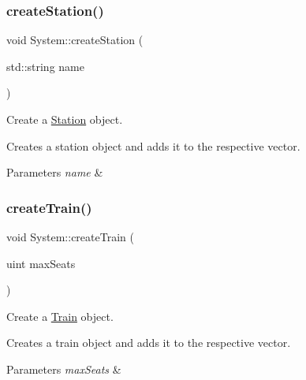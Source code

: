 \subsubsection{\texorpdfstring{create\+Station()}{createStation()}}
{\footnotesize\ttfamily void System\+::create\+Station (\begin{DoxyParamCaption}\item[{std\+::string}]{name }\end{DoxyParamCaption})}



Create a \mbox{\hyperlink{classStation}{Station}} object. 

Creates a station object and adds it to the respective vector.


\begin{DoxyParams}{Parameters}
{\em name} & \\
\hline
\end{DoxyParams}
\mbox{\label{classSystem_aa4cf09119e31e5bdf9d9187a7a60cd1a}} 
\subsubsection{\texorpdfstring{create\+Train()}{createTrain()}}
{\footnotesize\ttfamily void System\+::create\+Train (\begin{DoxyParamCaption}\item[{uint}]{max\+Seats }\end{DoxyParamCaption})}



Create a \mbox{\hyperlink{classTrain}{Train}} object. 

Creates a train object and adds it to the respective vector.


\begin{DoxyParams}{Parameters}
{\em max\+Seats} & \\
\hline
\end{DoxyParams}
\mbox{\label{classSystem_aea8519bf009400085f8e499891b7eb37}} 
